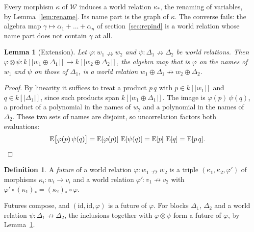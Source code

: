 \documentclass[11pt,a4paper]{report}
\theoremstyle{plain}
\newtheorem{lemma}[theorem]{Lemma}
\theoremstyle{definition}
\newtheorem{definition}[theorem]{Definition}
\theoremstyle{remark}
\newcommand{\E}{\operatorname{E}}
\newcommand{\W}{\mathcal{W}}
\begin{document}
Every morphism $\kappa$ of $\W$ induces a world relation $\kappa_*$, the renaming
of variables, by Lemma~\ref{lem:rename}. Its name part is the graph of $\kappa$.
The converse fails: the algebra
map $\gamma \mapsto \alpha_1 + \dots + \alpha_n$ of section~\ref{sec:repind} is a
world relation whose name part does not contain $\gamma$ at all.

\begin{lemma}[Extension]
\label{lem:extension}
Let $\varphi : w_1 \nrightarrow w_2$ and $\psi : \Delta_1 \nrightarrow \Delta_2$
be world relations. Then
$\varphi \otimes \psi : k[|w_1 \oplus \Delta_1|] \to k[|w_2 \oplus \Delta_2|]$,
the algebra map that is $\varphi$ on the names of $w_1$ and $\psi$ on those of
$\Delta_1$, is a world relation
$w_1 \oplus \Delta_1 \nrightarrow w_2 \oplus \Delta_2$.
\end{lemma}

\begin{proof}
By linearity it suffices to treat a product $p\,q$ with $p \in k[|w_1|]$ and
$q \in k[|\Delta_1|]$, since such products span $k[|w_1 \oplus \Delta_1|]$. The
image is $\varphi(p)\,\psi(q)$, a product of a polynomial in the names of $w_2$
and a polynomial in the names of $\Delta_2$. These two sets of names are disjoint,
so uncorrelation factors both evaluations:
\[
  \E\bigl[\varphi(p)\,\psi(q)\bigr] = \E[\varphi(p)]\,\E[\psi(q)]
    = \E[p]\,\E[q] = \E[p\,q] . \qedhere
\]
\end{proof}

\begin{definition}
\label{def:future}
A \emph{future} of a world relation $\varphi : w_1 \nrightarrow w_2$ is a triple
$(\kappa_1, \kappa_2, \varphi')$ of morphisms $\kappa_i : w_i \to v_i$ and a world
relation $\varphi' : v_1 \nrightarrow v_2$ with
$\varphi' \circ (\kappa_1)_* = (\kappa_2)_* \circ \varphi$.
\end{definition}

Futures compose, and $(\mathrm{id}, \mathrm{id}, \varphi)$ is a future of
$\varphi$. For blocks $\Delta_1$, $\Delta_2$ and a world relation
$\psi : \Delta_1 \nrightarrow \Delta_2$, the inclusions together with
$\varphi \otimes \psi$ form a future of $\varphi$, by Lemma~\ref{lem:extension}.
\end{document}

